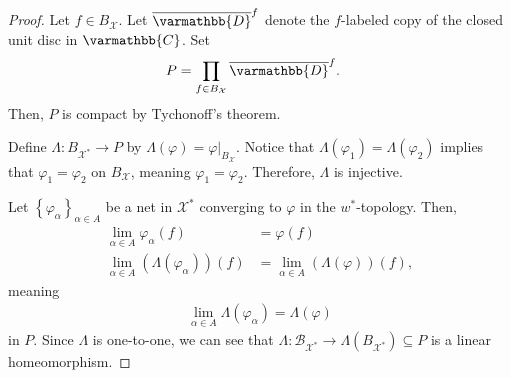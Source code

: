 \documentclass[12pt]{extarticle}
\newcommand{\C}{\mathbb{C}}
\newcommand{\set}[1]{\left\{#1\right\}}
\theoremstyle{plain}
\theoremstyle{definition}
\theoremstyle{note}
\renewcommand*{\mathbb}[1]{\varmathbb{#1}}
\renewcommand{\newline}{\hfill\break}
\begin{document}
\begin{proof}
  Let $f\in B_{\mathcal{X}}$. Let $\overline{\mathbb{D}}^{f}$ denote the $f$-labeled copy of the closed unit disc in $\C$. Set
  \begin{align*}
    P &= \prod_{f\in B_{\mathcal{X}}}\overline{\mathbb{D}}^{f}.
  \end{align*}
  Then, $P$ is compact by Tychonoff's theorem.\newline

  Define $\Lambda: B_{\mathcal{X}^{\ast}} \rightarrow P$ by $\Lambda(\varphi) = \varphi\vert_{B_{\mathcal{X}}}$. Notice that $\Lambda(\varphi_1) = \Lambda(\varphi_2)$ implies that $\varphi_1 = \varphi_2$ on $B_{\mathcal{X}}$, meaning $\varphi_1 = \varphi_2$. Therefore, $\Lambda$ is injective.\newline

  Let $\set{\varphi_{\alpha}}_{\alpha \in A}$ be a net in $\mathcal{X}^{\ast}$ converging to $\varphi$ in the $w^{\ast}$-topology. Then,
  \begin{align*}
    \lim_{\alpha \in A}\varphi_{\alpha}(f) &= \varphi(f)\\
    \lim_{\alpha \in A}\left(\Lambda\left(\varphi_{\alpha}\right)\right)(f) &= \lim_{\alpha \in A}\left(\Lambda\left(\varphi\right)\right)(f),
  \end{align*}
  meaning
  \begin{align*}
    \lim_{\alpha \in A}\Lambda\left(\varphi_{\alpha}\right) = \Lambda\left(\varphi\right)
  \end{align*}
  in $P$. Since $\Lambda$ is one-to-one, we can see that $\Lambda: \mathcal{B}_{\mathcal{X}^{\ast}} \rightarrow \Lambda\left(B_{\mathcal{X}^{\ast}}\right)\subseteq P$ is a linear homeomorphism.\newline


\end{proof}
\end{document}
